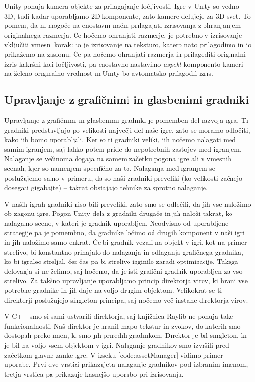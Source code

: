 \documentclass[12pt,a4paper,twoside]{book}
\begin{document}
Unity ponuja kamera objekte za prilagajanje ločljivosti. Igre v Unity so vedno 3D, tudi kadar uporabljamo 2D komponente, zato kamere delujejo za 3D svet. To pomeni, da ni mogoče na enostavni način prilagajati izrisovanja z ohranjanjem originalnega razmerja. Če hočemo ohranjati razmerje, je potrebno v izrisovanje vključiti vmesni korak: to je izrisovanje na teksturo, katero nato prilagodimo in jo prikažemo na zaslonu. Če pa nočemo ohranjati razmerja in prilagoditi originalni izris kakršni koli ločljivosti, pa enostavno nastavimo \textit{aspekt} komponento kameri na želeno originalno vrednost in Unity bo avtomatsko prilagodil izris.

\subsection{Upravljanje z grafičnimi in glasbenimi gradniki}
\label{section:upravljanje}
Upravljanje z grafičnimi in glasbenimi gradniki je pomemben del razvoja igra. Ti gradniki predstavljajo po velikosti največji del naše igre, zato se moramo odločiti, kako jih bomo uporabljali. Ker so ti gradniki veliki, jih nočemo nalagati med samim igranjem, saj lahko potem pride do nepotrebnih zastojev med igranjem. Nalaganje se večinoma dogaja na samem začetku pogona igre ali v vmesnih scenah, kjer so namenjeni specifično za to. Nalaganja med igranjem se poslužujemo samo v primeru, da so naši gradniki preveliki (ko velikosti začnejo dosegati gigabajte) -- takrat obstajajo tehnike za sprotno nalaganje.

V naših igrah gradniki niso bili preveliki, zato smo se odločili, da jih vse naložimo ob zagonu igre. Pogon Unity dela z gradniki drugače in jih naloži takrat, ko nalagamo sceno, v kateri je gradnik uporabljen. Neodvisno od uporabljene strategije pa je pomembno, da gradnike ločimo od drugih komponent v naši igri in jih naložimo samo enkrat. Če bi gradnik vezali na objekt v igri, kot na primer strelivo, bi konstantno prihajalo do nalaganja in odlaganja grafičnega gradnika, ko bi igralec streljal, čez čas pa bi strelivo izginilo zaradi optimizacije. Takega delovanja si ne želimo, saj hočemo, da je isti grafični gradnik uporabljen za vso strelivo. Za takšno upravljanje uporabljamo princip direktorja virov, ki hrani vse potrebne gradnike in jih daje na voljo drugim objektom. Velikokrat se ti direktorji poslužujejo singleton principa, saj nočemo več instanc direktorja virov.

V C++ smo si sami ustvarili direktorja, saj knjižnica Raylib ne ponuja take funkcionalnosti. Naš direktor je hranil mapo tekstur in zvokov, do katerih smo dostopali preko imen, ki smo jih priredili gradnikom. Direktor je bil singleton, ki je bil na voljo vsem objektom v igri. Nalaganje gradnikov smo izvršili pred začetkom glavne zanke igre. V izseku \ref{code:assetManager} vidimo primer uporabe. Prvi dve vrstici prikazujeta nalaganje gradnikov pod izbranim imenom, tretja vrstica pa prikazuje kasnejšo uporabo pri izrisovanju. 
\end{document}
